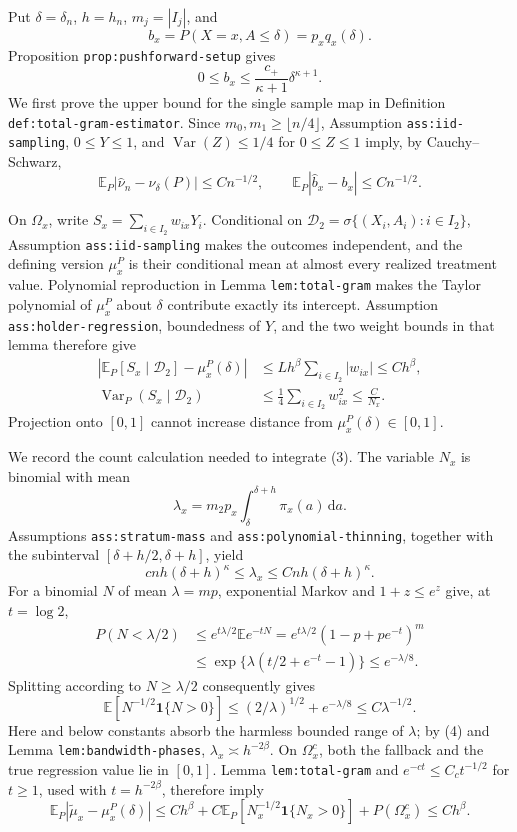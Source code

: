 Put \(\delta=\delta_n\), \(h=h_n\), \(m_j=|I_j|\), and
\[
 b_x=P(X=x,A\leq\delta)=p_xq_x(\delta).
\]
Proposition \texttt{prop:pushforward-setup} gives
\[
 0\leq b_x\leq \frac{c_+}{\kappa+1}\delta^{\kappa+1}. \tag{1}
\]
We first prove the upper bound for the single sample map in Definition \texttt{def:total-gram-estimator}.  Since \(m_0,m_1\geq\lfloor n/4\rfloor\), Assumption \texttt{ass:iid-sampling}, \(0\leq Y\leq1\), and \(\operatorname{Var}(Z)\leq1/4\) for \(0\leq Z\leq1\) imply, by Cauchy--Schwarz,
\[
 \mathbb E_P|\widehat\nu_n-\nu_\delta(P)|\leq Cn^{-1/2},
 \qquad
 \mathbb E_P|\widehat b_x-b_x|\leq Cn^{-1/2}. \tag{2}
\]

On \(\Omega_x\), write \(S_x=\sum_{i\in I_2}w_{ix}Y_i\).  Conditional on \(\mathscr D_2=\sigma\{(X_i,A_i):i\in I_2\}\), Assumption \texttt{ass:iid-sampling} makes the outcomes independent, and the defining version \(\mu_x^P\) is their conditional mean at almost every realized treatment value.  Polynomial reproduction in Lemma \texttt{lem:total-gram} makes the Taylor polynomial of \(\mu_x^P\) about \(\delta\) contribute exactly its intercept.  Assumption \texttt{ass:holder-regression}, boundedness of \(Y\), and the two weight bounds in that lemma therefore give
\[
 \begin{aligned}
 \left|\mathbb E_P[S_x\mid\mathscr D_2]-\mu_x^P(\delta)\right|
 &\leq Lh^\beta\sum_{i\in I_2}|w_{ix}|\leq Ch^\beta,\\
 \operatorname{Var}_P(S_x\mid\mathscr D_2)
 &\leq\frac14\sum_{i\in I_2}w_{ix}^2\leq\frac{C}{N_x}.
 \end{aligned} \tag{3}
\]
Projection onto \([0,1]\) cannot increase distance from \(\mu_x^P(\delta)\in[0,1]\).

We record the count calculation needed to integrate (3).  The variable \(N_x\) is binomial with mean
\[
 \lambda_x=m_2p_x\int_\delta^{\delta+h}\pi_x(a)\,\mathrm da.
\]
Assumptions \texttt{ass:stratum-mass} and \texttt{ass:polynomial-thinning}, together with the subinterval \([\delta+h/2,\delta+h]\), yield
\[
 cnh(\delta+h)^\kappa\leq\lambda_x\leq Cnh(\delta+h)^\kappa. \tag{4}
\]
For a binomial \(N\) of mean \(\lambda=mp\), exponential Markov and \(1+z\leq e^z\) give, at \(t=\log2\),
\[
 \begin{aligned}
 P(N<\lambda/2)
 &\leq e^{t\lambda/2}\mathbb E e^{-tN}
 =e^{t\lambda/2}(1-p+pe^{-t})^m\\
 &\leq\exp\{\lambda(t/2+e^{-t}-1)\}
 \leq e^{-\lambda/8}.
 \end{aligned}
\]
Splitting according to \(N\geq\lambda/2\) consequently gives
\[
 \mathbb E[N^{-1/2}\mathbf 1\{N>0\}]
 \leq (2/\lambda)^{1/2}+e^{-\lambda/8}
 \leq C\lambda^{-1/2}. \tag{5}
\]
Here and below constants absorb the harmless bounded range of \(\lambda\); by (4) and Lemma \texttt{lem:bandwidth-phases}, \(\lambda_x\asymp h^{-2\beta}\).  On \(\Omega_x^c\), both the fallback and the true regression value lie in \([0,1]\).  Lemma \texttt{lem:total-gram} and \(e^{-ct}\leq C_ct^{-1/2}\) for \(t\geq1\), used with \(t=h^{-2\beta}\), therefore imply
\[
 \mathbb E_P|\widetilde\mu_x-\mu_x^P(\delta)|
 \leq Ch^\beta+C\mathbb E_P[N_x^{-1/2}\mathbf 1\{N_x>0\}]
       +P(\Omega_x^c)
 \leq Ch^\beta. \tag{6}
\]


